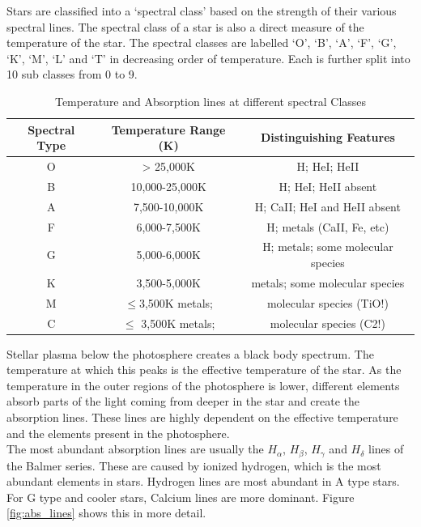 \documentclass[12pt,a4paper]{article}
\begin{document}
    Stars are classified into a `spectral class' based on the strength of their various spectral lines. The spectral class of a star is also a direct measure of the temperature of the star. The spectral classes are labelled
    `O', `B', `A', `F', `G', `K', `M', `L' and `T' in decreasing order of temperature. Each is further split into 10 sub classes from 0 to 9. \\
    \begin{table}[H]
      \begin{tabular}{||c|c|c||}
        \hline
        Spectral Type & Temperature Range (K) & Distinguishing Features\\
        \hline
        \hline
        O	&> 25,000K	&H; HeI; HeII\\
        B	&10,000-25,000K	&H; HeI; HeII absent\\
        A	&7,500-10,000K	&H; CaII; HeI and HeII absent\\
        F	&6,000-7,500K	  &H; metals (CaII, Fe, etc)\\
        G	&5,000-6,000K  	&H; metals; some molecular species\\
        K	&3,500-5,000K	  &metals; some molecular species\\
        M	&$\leq $3,500K	metals;& molecular species (TiO!)\\
        C	&$\leq $ 3,500K	metals; &molecular species (C2!)\\
        \hline
      \end{tabular}
      \caption{Temperature and Absorption lines at different spectral Classes\cite{Spectral_Classification}}
    \end{table} 
    Stellar plasma below the photosphere creates a black body spectrum. The temperature at which this peaks is the effective temperature of the star. As the temperature in the outer regions of the photosphere is lower,
    different elements absorb parts of the light coming from deeper in the star and create the absorption lines. These lines are highly dependent on the effective temperature and the elements present in the photosphere.
    \\
    The most abundant absorption lines are usually the $H_\alpha$, $H_\beta$, $H_\gamma$ and $H_\delta$ lines of the Balmer series. These are caused by ionized hydrogen, which is the most abundant elements in stars.
    Hydrogen lines are most abundant in A type stars. For G type and cooler stars, Calcium lines are more dominant. Figure \ref{fig:abs_lines} shows this in more detail.
\end{document}
